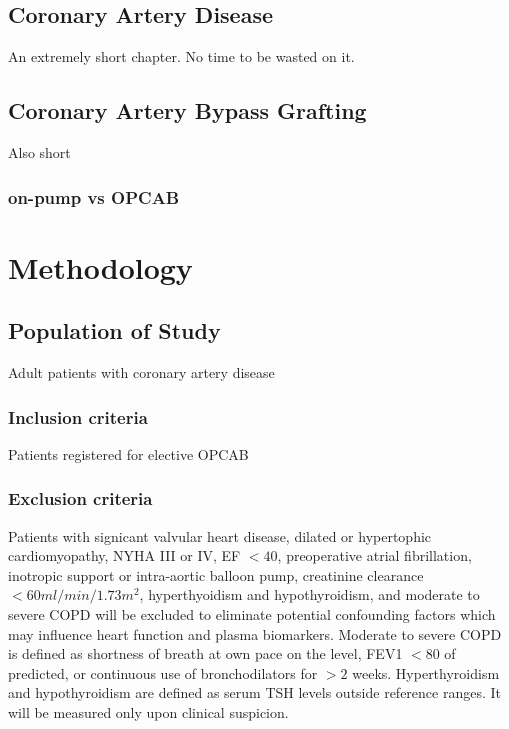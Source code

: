 \documentclass[14pt,a4paper,onecolumn]{article}
\begin{document}
\subsection{Coronary Artery Disease}
An extremely short chapter.  No time to be wasted on it.

\subsection{Coronary Artery Bypass Grafting}
Also short
\subsubsection{on-pump vs OPCAB}


\section{Methodology}

\subsection{Population of Study}

Adult patients with coronary artery disease

\subsubsection{Inclusion criteria}

Patients registered for elective OPCAB

\subsubsection{Exclusion criteria}

Patients with signicant valvular heart disease, dilated or hypertophic cardiomyopathy, NYHA III or IV, EF $< 40$, preoperative atrial fibrillation, inotropic support or intra-aortic balloon pump, creatinine clearance $< 60 ml/min/1.73 m^2$, hyperthyoidism and hypothyroidism, and moderate to severe COPD will be excluded to eliminate potential confounding factors which may influence heart function and plasma biomarkers.  Moderate to severe COPD is defined as shortness of breath at own pace on the level, FEV1 $< 80$ of predicted, or continuous use of bronchodilators for $> 2$ weeks.  Hyperthyroidism and hypothyroidism are defined as serum TSH levels outside reference ranges.  It will be measured only upon clinical suspicion.
\end{document}
